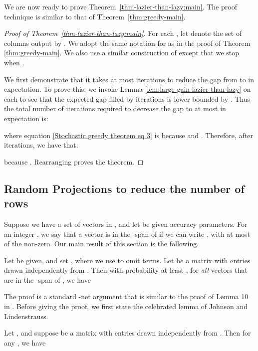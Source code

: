 \documentclass{article}
\begin{document}
We are now ready to prove Theorem~\ref{thm-lazier-than-lazy:main}. The proof technique is similar to that of Theorem~\ref{thm:greedy-main}.
\begin{proof}[Proof of Theorem~\ref{thm-lazier-than-lazy:main}]
For each , let  denote the set of  columns output by . We adopt the same notation for  as in the proof of Theorem \ref{thm:greedy-main}. We also use a similar construction of  except that we stop when .

We first demonstrate that it takes at most  iterations to reduce the gap from  to  in expectation. To prove this, we invoke Lemma \ref{lem:large-gain-lazier-than-lazy} on each  to see that the expected gap filled by  iterations is lower bounded by . Thus the total number of iterations  required to decrease the gap to at most  in expectation is:

where equation \eqref{Stochastic greedy theorem eq 3} is because  and . Therefore, after  iterations, we have that:

because . Rearranging proves the theorem.
\end{proof}

\subsection{Random Projections to reduce the number of rows} \label{app:random-projections}
Suppose we have a set of vectors  in
, and let  be given accuracy parameters. For an integer , we say that a vector  is in the -span of  if we can write , with at most  of the  non-zero. Our main result of this section is the following.

\begin{thm} \label{thm:random-projections}
Let  be given, and set , where we use  to omit  terms.  Let  be a matrix with entries drawn independently from . Then with probability at least ,
for {\em all} vectors  that are in the -span of
, we have

\end{thm}

The proof is a standard -net argument that is similar to the proof of Lemma 10 in \cite{Sarlos}. Before giving the proof, we first state the celebrated lemma of Johnson and Lindenstrauss.
\begin{thm}\label{thm:jl-classic}\cite{Johnson}
Let , and suppose  be a matrix with entries drawn independently from .  Then for any , we have 
\end{thm}
\end{document}
